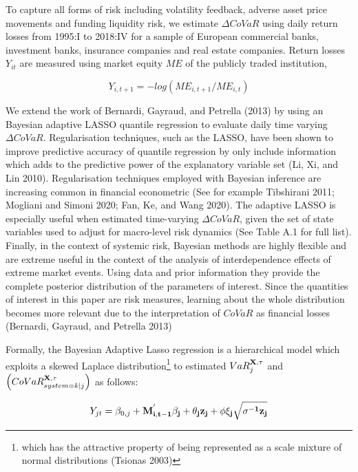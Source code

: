 \documentclass[
  10pt,
]{article}
\begin{document}
To capture all forms of risk including volatility feedback, adverse
asset price movements and funding liquidity risk, we estimate
\(\Delta CoVaR\) using daily return losses from 1995:I to 2018:IV for a
sample of European commercial banks, investment banks, insurance
companies and real estate companies. Return losses \(Y_{it}\) are
measured using market equity \(ME\) of the publicly traded institution,

\begin{equation}\label{eq:eq3}
Y_{i,t+1}=-log(ME_{i,t+1}/ME_{i,t})
\end{equation}

We extend the work of Bernardi, Gayraud, and Petrella (2013) by using an
Bayesian adaptive LASSO quantile regression to evaluate daily time
varying \(\Delta CoVaR\). Regularisation techniques, such as the LASSO,
have been shown to improve predictive accuracy of quantile regression by
only include information which adds to the predictive power of the
explanatory variable set (Li, Xi, and Lin 2010). Regularisation
techniques employed with Bayesian inference are increasing common in
financial econometric (See for example Tibshirani 2011; Mogliani and
Simoni 2020; Fan, Ke, and Wang 2020). The adaptive LASSO is especially
useful when estimated time-varying \(\Delta CoVaR\), given the set of
state variables used to adjust for macro-level risk dynamics (See Table
A.1 for full list). Finally, in the context of systemic risk, Bayesian
methods are highly flexible and are extreme useful in the context of the
analysis of interdependence effects of extreme market events. Using data
and prior information they provide the complete posterior distribution
of the parameters of interest. Since the quantities of interest in this
paper are risk measures, learning about the whole distribution becomes
more relevant due to the interpretation of \(CoVaR\) as financial losses
(Bernardi, Gayraud, and Petrella 2013)

Formally, the Bayesian Adaptive Lasso regression is a hierarchical model
which exploits a skewed Laplace distribution\footnote{which has the
  attractive property of being represented as a scale mixture of normal
  distributions (Tsionas 2003)} to estimated \(VaR^{\bf{X},\tau}_j\) and
\(\left( CoVaR_{system=k|j}^{\bf{X},\tau} \right)\) as follows:

\begin{equation}\label{eq:eq4}
Y_{jt}=\beta_{0,j}+\bf{M^{'}_{i,t-1}} \bf{\beta_j} +\theta_j z_j+\phi \xi_j \sqrt{\sigma^{-1}z_j} 
\end{equation}
\end{document}
